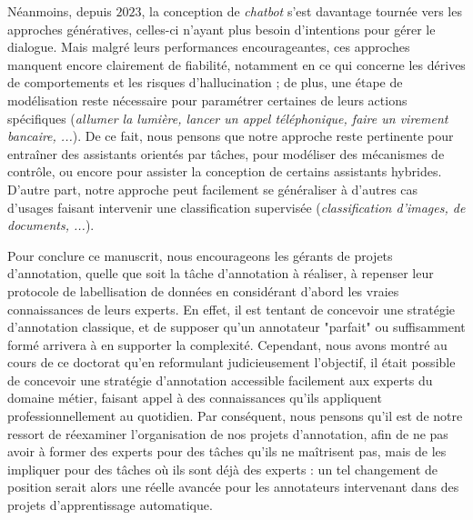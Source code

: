 		Néanmoins, depuis $2023$, la conception de \textit{chatbot} s'est davantage tournée vers les approches génératives, celles-ci n'ayant plus besoin d'intentions pour gérer le dialogue.
		Mais malgré leurs performances encourageantes, ces approches manquent encore clairement de fiabilité, notamment en ce qui concerne les dérives de comportements et les risques d'hallucination ; de plus, une étape de modélisation reste nécessaire pour paramétrer certaines de leurs actions spécifiques (\textit{allumer la lumière, lancer un appel téléphonique, faire un virement bancaire, ...}).
		De ce fait, nous pensons que notre approche reste pertinente pour entraîner des assistants orientés par tâches, pour modéliser des mécanismes de contrôle, ou encore pour assister la conception de certains assistants hybrides.
		D'autre part, notre approche peut facilement se généraliser à d'autres cas d'usages faisant intervenir une classification supervisée (\textit{classification d'images, de documents, ...}).
		
		Pour conclure ce manuscrit, nous encourageons les gérants de projets d'annotation, quelle que soit la tâche d'annotation à réaliser, à repenser leur protocole de labellisation de données en considérant d'abord les vraies connaissances de leurs experts.
		En effet, il est tentant de concevoir une stratégie d'annotation classique, et de supposer qu'un annotateur "parfait" ou suffisamment formé arrivera à en supporter la complexité.
		Cependant, nous avons montré au cours de ce doctorat qu'en reformulant judicieusement l'objectif, il était possible de concevoir une stratégie d'annotation accessible facilement aux experts du domaine métier, faisant appel à des connaissances qu'ils appliquent professionnellement au quotidien.
		Par conséquent, nous pensons qu'il est de notre ressort de réexaminer l'organisation de nos projets d'annotation, afin de ne pas avoir à former des experts pour des tâches qu'ils ne maîtrisent pas, mais de les impliquer pour des tâches où ils sont déjà des experts : un tel changement de position serait alors une réelle avancée pour les annotateurs intervenant dans des projets d'apprentissage automatique.